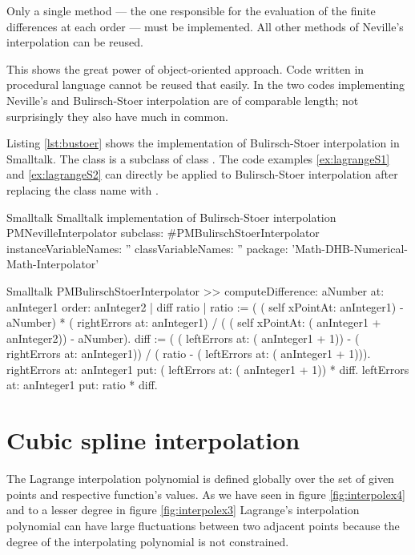 Only a single method --- the one responsible for the evaluation of
the finite differences at each order --- must be implemented. All
other methods of Neville's interpolation can be reused.

This shows the great power of object-oriented approach. Code
written in procedural language cannot be reused that easily. In
\cite{Press} the two codes implementing Neville's and
Bulirsch-Stoer interpolation are of comparable length; not
surprisingly they also have much in common.

Listing \ref{lst:bustoer} shows the implementation of
Bulirsch-Stoer interpolation in Smalltalk. The class  is a subclass of class . The code examples \ref{ex:lagrangeS1} and
\ref{ex:lagrangeS2} can directly be applied to Bulirsch-Stoer
interpolation after replacing the class name  with .

\begin{listing}[label=lst:bustoer]{Smalltalk}
{Smalltalk implementation of Bulirsch-Stoer interpolation}
PMNevilleInterpolator subclass: #PMBulirschStoerInterpolator
   instanceVariableNames: ''
   classVariableNames: ''
   package: 'Math-DHB-Numerical-Math-Interpolator'
\end{listing}

\begin{displaycode}{Smalltalk}
PMBulirschStoerInterpolator >> computeDifference: aNumber at: anInteger1 order: anInteger2
    | diff ratio |
    ratio := ( ( self xPointAt: anInteger1) - aNumber) * ( 
                                           rightErrors at: anInteger1)
                            / ( (  self xPointAt: ( anInteger1 + 
                                              anInteger2)) - aNumber).
    diff := ( ( leftErrors at: ( anInteger1 + 1)) - ( rightErrors at: 
                                                          anInteger1))
                            / ( ratio - ( leftErrors at: ( anInteger1 
                                                               + 1))).
    rightErrors at: anInteger1 put: ( leftErrors at: ( anInteger1 + 
                                                          1)) * diff. 
    leftErrors at: anInteger1 put: ratio * diff.
\end{displaycode}

\section{Cubic spline interpolation}
The Lagrange interpolation polynomial is defined globally over the
set of given points and respective function's values. As we have
seen in figure \ref{fig:interpolex4} and to a lesser degree in
figure \ref{fig:interpolex3} Lagrange's interpolation polynomial
can have large fluctuations between two adjacent points because
the degree of the interpolating polynomial is not constrained.

